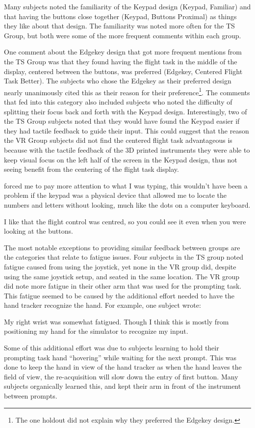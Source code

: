 Many subjects noted the familiarity of the Keypad design (Keypad, Familiar) and that having the buttons close together (Keypad, Buttons Proximal) as things they like about that design.
The familiarity was noted more often for the TS Group, but both were some of the more frequent comments within each group.

One comment about the Edgekey design that got more frequent mentions from the TS Group was that they found having the flight task in the middle of the display, centered between the buttons, was preferred (Edgekey, Centered Flight Task Better).
The subjects who chose the Edgekey as their preferred design nearly unanimously cited this as their reason for their preference\footnote{The one holdout did not explain why they preferred the Edgekey design.}.
The comments that fed into this category also included subjects who noted the difficulty of splitting their focus back and forth with the Keypad design.
Interestingly, two of the TS Group subjects noted that they would have found the Keypad easier if they had tactile feedback to guide their input.
This could suggest that the reason the VR Group subjects did not find the centered flight task advantageous is because with the tactile feedback of the 3D printed instruments they were able to keep visual focus on the left half of the screen in the Keypad design, thus not seeing benefit from the centering of the flight task display.
\begin{displayquote}[TS Subject]
     forced me to pay more attention to what I was typing, this wouldn't have been a problem if the keypad was a physical device that allowed me to locate the numbers and letters without looking, much like the dots on a computer keyboard.
\end{displayquote}
\begin{displayquote}[VR Subject]
    I like that the flight control was centred, so you could see it even when you were looking at the buttons.
\end{displayquote}

The most notable exceptions to providing similar feedback between groups are the categories that relate to fatigue issues.
Four subjects in the TS group noted fatigue caused from using the joystick, yet none in the VR group did, despite using the same joystick setup, and seated in the same location.
The VR group did note more fatigue in their other arm that was used for the prompting task.
This fatigue seemed to be caused by the additional effort needed to have the hand tracker recognize the hand.
For example, one subject wrote:
\begin{displayquote}[VR Subject]
    My right wrist was somewhat fatigued.  Though I think this is mostly from positioning my hand for the simulator to recognize my input.
\end{displayquote}
Some of this additional effort was due to subjects learning to hold their prompting task hand ``hovering'' while waiting for the next prompt.
This was done to keep the hand in view of the hand tracker as when the hand leaves the field of view, the re-acquisition will slow down the entry of first button.
Many subjects organically learned this, and kept their arm in front of the instrument between prompts.

